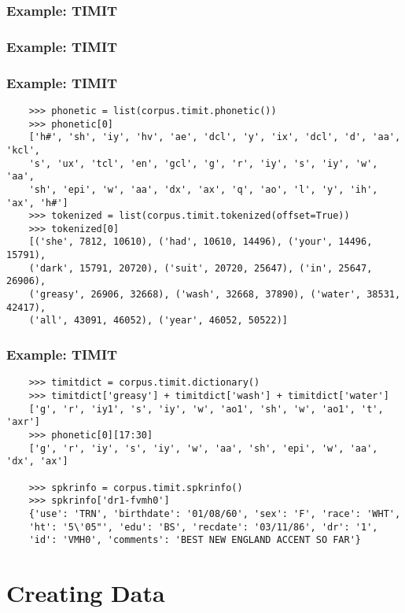 \documentclass{beamer}             %
\begin{document}
\begin{frame}
\frametitle{Example: TIMIT}
\end{frame}

\begin{frame}
\frametitle{Example: TIMIT}
\end{frame}

\begin{frame}[fragile]
\frametitle{Example: TIMIT}
\scriptsize
\begin{verbatim}
    >>> phonetic = list(corpus.timit.phonetic())
    >>> phonetic[0]
    ['h#', 'sh', 'iy', 'hv', 'ae', 'dcl', 'y', 'ix', 'dcl', 'd', 'aa', 'kcl',
    's', 'ux', 'tcl', 'en', 'gcl', 'g', 'r', 'iy', 's', 'iy', 'w', 'aa',
    'sh', 'epi', 'w', 'aa', 'dx', 'ax', 'q', 'ao', 'l', 'y', 'ih', 'ax', 'h#']
    >>> tokenized = list(corpus.timit.tokenized(offset=True))
    >>> tokenized[0]
    [('she', 7812, 10610), ('had', 10610, 14496), ('your', 14496, 15791),
    ('dark', 15791, 20720), ('suit', 20720, 25647), ('in', 25647, 26906),
    ('greasy', 26906, 32668), ('wash', 32668, 37890), ('water', 38531, 42417),
    ('all', 43091, 46052), ('year', 46052, 50522)]
\end{verbatim}
\end{frame}

\begin{frame}[fragile]
\frametitle{Example: TIMIT}
\scriptsize
\begin{verbatim}
    >>> timitdict = corpus.timit.dictionary()
    >>> timitdict['greasy'] + timitdict['wash'] + timitdict['water']
    ['g', 'r', 'iy1', 's', 'iy', 'w', 'ao1', 'sh', 'w', 'ao1', 't', 'axr']
    >>> phonetic[0][17:30]
    ['g', 'r', 'iy', 's', 'iy', 'w', 'aa', 'sh', 'epi', 'w', 'aa', 'dx', 'ax']

    >>> spkrinfo = corpus.timit.spkrinfo()
    >>> spkrinfo['dr1-fvmh0']
    {'use': 'TRN', 'birthdate': '01/08/60', 'sex': 'F', 'race': 'WHT',
    'ht': '5\'05"', 'edu': 'BS', 'recdate': '03/11/86', 'dr': '1',
    'id': 'VMH0', 'comments': 'BEST NEW ENGLAND ACCENT SO FAR'}
\end{verbatim}
\end{frame}

\section{Creating Data}
\end{document}
